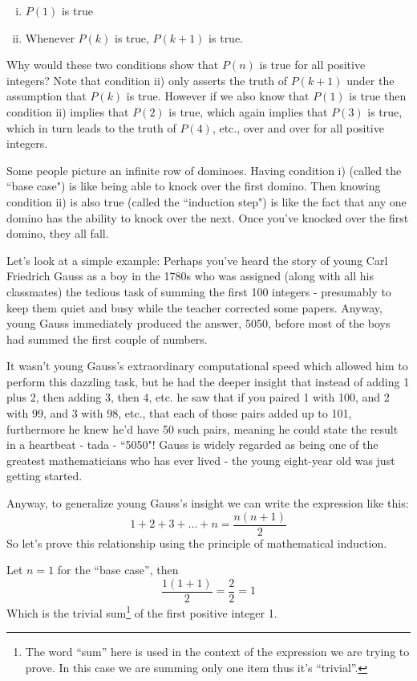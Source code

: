 \documentclass{article}
\begin{document}
\begin{enumerate}[i)]
\item $P(1)$ is true
\item Whenever $P(k)$ is true, $P(k+1)$ is true.
\end{enumerate}

Why would these two conditions show that $P(n)$ is true for all
positive integers? Note that condition ii) only asserts the truth
of $P(k+1)$ under the assumption that $P(k)$ is true.
However if we also know that $P(1)$ is true then condition ii) implies that $P(2)$ is true,
which again implies that $P(3)$ is true,
which in turn leads to the truth of $P(4)$,
etc., over and over for all positive integers.

Some people picture an infinite row of dominoes.
Having condition i) (called the ``base case") is like being
able to knock over the first domino.
Then knowing condition ii) is also true (called the ``induction step") is like the
fact that any one domino has the ability to knock over the next.
Once you've knocked over the first domino,
they all fall.

Let's look at a simple example:
Perhaps you've heard the story of young Carl Friedrich Gauss
as a boy in
the 1780s who was assigned (along with all his classmates)
the tedious task of summing the first 100 integers -
presumably to keep them quiet and busy while the
teacher corrected some papers. Anyway,
young Gauss immediately produced the answer,
5050, before most of the boys had summed the first couple of numbers.

It wasn't young Gauss's extraordinary computational speed which allowed
him to perform this dazzling task,
but he had the deeper insight that instead of adding 1 plus 2,
then adding 3, then 4, etc.
he saw that if you paired 1 with 100,
and 2 with 99,
and 3 with 98,
etc.,
that each of those pairs added up to 101,
furthermore he knew he'd have 50 such pairs,
meaning he could state the result in a heartbeat - tada - ``5050"!
Gauss is widely regarded as being one of the greatest
mathematicians who has ever lived - the young eight-year old was just getting started.

\break
Anyway,
to generalize young Gauss's insight we can write the expression like this:
\[1+2+3+\ldots+n=\frac{n(n+1)}{2}\]
So let's prove this relationship using the principle of mathematical induction.
\bigskip

Let $n=1$ for the ``base case'',
then
\[\frac{1(1+1)}{2}=\frac{2}{2}=1\]
Which is the trivial sum\footnote{The word ``sum'' here is used
in the context of the expression
we are trying to prove. In this case we are summing
only one item thus it's ``trivial''.} of the first positive integer 1.
\bigskip
\end{document}
